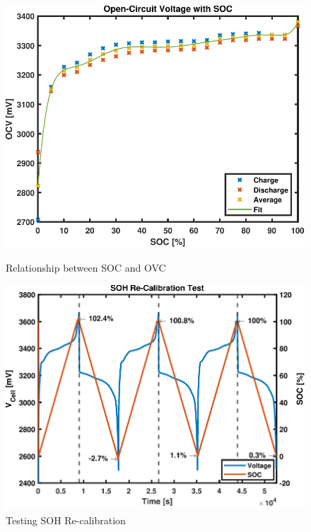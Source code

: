\documentclass[10pt,twoside]{article}
\begin{document}
\begin{figure}[hbt!]
  \begin{minipage}[b]{0.44\textwidth}
    \centering
    \includegraphics[width=\textwidth]{SOC_OVC.pdf}
    \caption{Relationship between SOC and OVC}
    \label{fig:SOC_OCV}
  \end{minipage}
  \hfill
  \begin{minipage}[b]{0.47\textwidth}
    \includegraphics[width=\textwidth]{SOHTest.pdf}
    \caption{Testing SOH Re-calibration}
    \label{fig:SOHTest}
  \end{minipage}
\end{figure}
\end{document}
